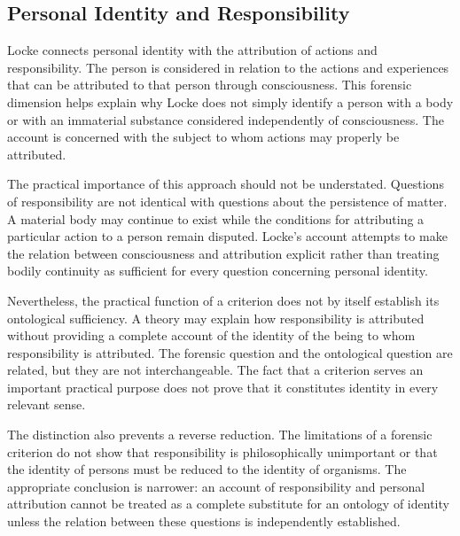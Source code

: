 \subsection{Personal Identity and Responsibility}
\label{subsec:ch08-locke-responsibility}

\label{para:VS.B01.P01.C08.S08.SS10.P001}

Locke connects personal identity with the attribution
of actions and responsibility. The person is
considered in relation to the actions and experiences
that can be attributed to that person through
consciousness. This forensic dimension helps
explain why Locke does not simply identify a
person with a body or with an immaterial substance
considered independently of consciousness. The
account is concerned with the subject to whom
actions may properly be attributed. \cite[II.xxvii.16--26]{LockeEssay}

\label{para:VS.B01.P01.C08.S08.SS10.P002}

The practical importance of this approach should
not be understated. Questions of responsibility
are not identical with questions about the
persistence of matter. A material body may
continue to exist while the conditions for
attributing a particular action to a person
remain disputed. Locke's account attempts to
make the relation between consciousness and
attribution explicit rather than treating
bodily continuity as sufficient for every
question concerning personal identity.

\label{para:VS.B01.P01.C08.S08.SS10.P003}

Nevertheless, the practical function of a
criterion does not by itself establish its
ontological sufficiency. A theory may explain
how responsibility is attributed without
providing a complete account of the identity
of the being to whom responsibility is attributed.
The forensic question and the ontological
question are related, but they are not
interchangeable. The fact that a criterion
serves an important practical purpose does
not prove that it constitutes identity in
every relevant sense.

\label{para:VS.B01.P01.C08.S08.SS10.P004}

The distinction also prevents a reverse
reduction. The limitations of a forensic
criterion do not show that responsibility
is philosophically unimportant or that the
identity of persons must be reduced to the
identity of organisms. The appropriate
conclusion is narrower: an account of
responsibility and personal attribution
cannot be treated as a complete substitute
for an ontology of identity unless the
relation between these questions is
independently established.


